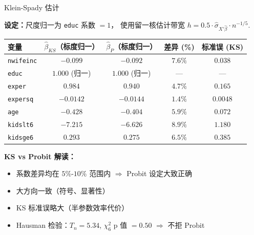 \documentclass[aspectratio=169, 10pt]{beamer}
\begin{document}
\begin{frame}{Klein-Spady 估计}

  \textbf{设定：}尺度归一为 \texttt{educ} 系数 $= 1$，
  使用留一核估计带宽 $h = 0.5 \cdot \hat\sigma_{X'\hat\beta} \cdot n^{-1/5}$.

  \begin{center}\footnotesize
  \begin{tabular}{l|c|c|c|c}
  \hline
  变量 & $\hat\beta_{KS}$（标度归一）& $\hat\beta_P$（标度归一） & 差异 (\%) & 标准误 (KS) \\
  \hline
  \texttt{nwifeinc} & $-0.099$ & $-0.092$ & $7.6\%$ & $0.038$ \\
  \texttt{educ} & $1.000$ (归一) & $1.000$ (归一) & --- & --- \\
  \texttt{exper} & $0.984$ & $0.940$ & $4.7\%$ & $0.165$ \\
  \texttt{expersq} & $-0.0142$ & $-0.0144$ & $1.4\%$ & $0.0048$ \\
  \texttt{age} & $-0.428$ & $-0.404$ & $5.9\%$ & $0.072$ \\
  \texttt{kidslt6} & $-7.215$ & $-6.626$ & $8.9\%$ & $1.180$ \\
  \texttt{kidsge6} & $0.293$ & $0.275$ & $6.5\%$ & $0.385$ \\
  \hline
  \end{tabular}
  \end{center}

  \begin{highlightbox}
    \textbf{KS vs Probit 解读：}
    \begin{itemize}\setlength{\itemsep}{1pt}
      \item 系数差异均在 $5\%$-$10\%$ 范围内 $\Rightarrow$ Probit 设定大致正确
      \item 大方向一致（符号、显著性）
      \item KS 标准误略大（半参数效率代价）
      \item Hausman 检验：$T_n = 5.34$, $\chi^2_6$ p 值 $= 0.50$ $\Rightarrow$ 不拒 Probit
    \end{itemize}
  \end{highlightbox}

\end{frame}
\end{document}
